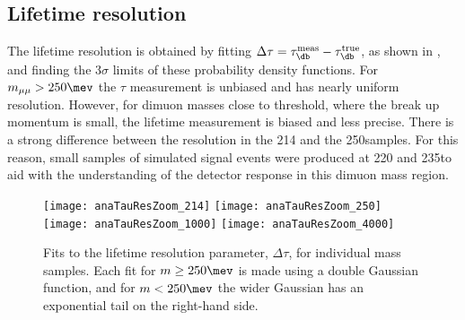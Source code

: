 




\subsection{Lifetime resolution}
The lifetime resolution is obtained by fitting
$\Delta\tau=\tau^\mathrm{meas}_{\db}-\tau^\mathrm{true}_{\db}$, as shown in
, and finding the $3\sigma$ limits of these
probability density functions.
For $m_{\mu\mu} > 250\mev$ the $\tau$ measurement is unbiased and has nearly uniform resolution.
However, for dimuon masses close to threshold, where the break up momentum is small, the lifetime
measurement is biased and less precise.
There is a strong difference between the resolution in the  214 and the 250\mev samples.
For this reason, small samples of simulated signal events were produced at 220 and 235\mev to aid
with the understanding of the detector response in this dimuon mass region.

\begin{figure}
  \begin{center}
    \texttt{[image: anaTauResZoom\_214]}
    \texttt{[image: anaTauResZoom\_250]}
    \texttt{[image: anaTauResZoom\_1000]}
    \texttt{[image: anaTauResZoom\_4000]}
  \end{center}
  \caption{
    Fits to the lifetime resolution parameter, $\Delta\tau$, for individual mass samples.
    Each fit for $m\geq250\mev$ is made using a double Gaussian function, and for $m<250\mev$ the
    wider Gaussian has an exponential tail on the right-hand side.
  }
  \label{fig:taures:zoom}
\end{figure}

